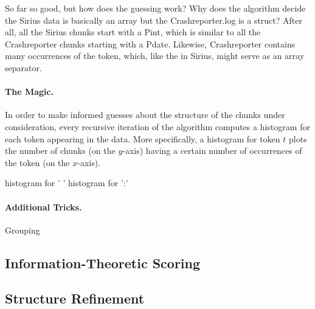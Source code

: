 So far so good, but how does the guessing work?  Why does the
algorithm decide the Sirius data is basically an array but the
Crashreporter.log is a struct? After all, all the Sirius chunks start
with a Pint, which is similar to all the Crashreporter chunks starting
with a Pdate.  Likewise, Crashreporter contains many occurrences of
the  token, which, like the  in Sirius, might serve as
an array separator.

\paragraph*{The Magic.}
In order to make informed guesses about the structure of the chunks
under consideration, every recursive iteration of the algorithm computes 
a histogram for each token appearing in the data.
More specifically, a histogram for token $t$
plots the number of chunks (on the $y$-axis)
having a certain number of occurrences of the token (on the $x$-axis). 

\begin {figure*}

histogram for ' '
histogram for ':'

\caption{Selected Histograms for Crashreporter.log}
\label{fig:histograms} 
\end{figure*}

\paragraph*{Additional Tricks.}
Grouping




\subsection {Information-Theoretic Scoring}



\subsection {Structure Refinement}

